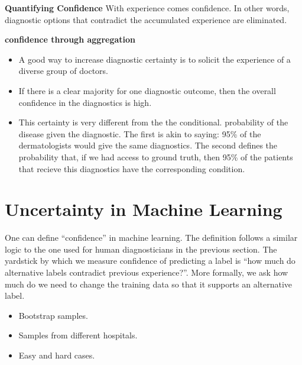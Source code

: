 \documentclass[9pt,twocolumn,twoside]{pnas-new}
\begin{document}
  {\bf Quantifying Confidence} With experience comes confidence. In
  other words, diagnostic options that contradict the accumulated
  experience are eliminated.
  
  {\bf confidence through aggregation}
  \begin{itemize}
    \item A good way to increase diagnostic certainty is to solicit
      the experience of a diverse group of doctors.
    \item If there is a clear majority for one diagnostic outcome,
      then the overall confidence in the diagnostics is high.
    \item This certainty is very different from the the conditional.
      probability of the disease given the diagnostic. The first is
      akin to saying: 95\% of the dermatologists would give the same
      diagnostics. The second defines the probability that, if we had
      access to ground truth, then 95\% of the patients that recieve
      this diagnostics have the corresponding condition.
    \end{itemize}
    
\section*{Uncertainty in Machine Learning}

One can define ``confidence'' in machine learning. The definition follows a
similar logic to the one used for human diagnosticians in the previous
section. The yardstick by which we measure confidence of predicting a
label is ``how much do alternative labels contradict previous
experience?''.
More formally, we ask how much do we need to change the training data
so that it supports an alternative label.




\begin{itemize}
  \item Bootstrap samples.
  \item Samples from different hospitals.
  \item Easy and hard cases.
  \end{itemize}
\end{document}
